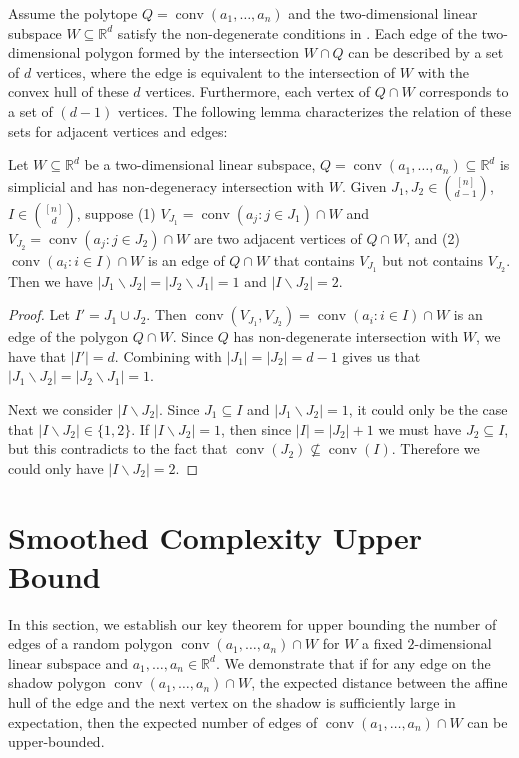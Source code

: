 \documentclass{theoretics}
\newcommand{\R}{\mathbb R}
\newcommand{\conv}{\operatorname{conv}}
\renewcommand{\subset}{\subseteq}
\begin{document}
Assume the polytope $Q = \conv(a_1,\dots,a_n)$ and the two-dimensional linear subspace $W \subset \R^d$ satisfy the non-degenerate conditions in .
Each edge of the two-dimensional polygon formed by the intersection $W \cap Q$ can be described by a set of $d$ vertices, where the edge is equivalent to the intersection of $W$ with the convex hull of these $d$ vertices. Furthermore, each vertex of $Q \cap W$ corresponds to a set of $(d-1)$ vertices. The following lemma characterizes the relation of these sets for adjacent vertices and edges:


\begin{fact}\label{fact:diff-adjacent-vertex}
    Let $W \subset \R^d$ be a two-dimensional linear subspace, $Q = \conv(a_1,\dots,a_n) \subset \R^d$ is simplicial and has non-degeneracy intersection with $W$. 
    Given $J_1, J_2 \in \binom{[n]}{d-1}$, $I \in \binom{[n]}{d}$, suppose
    (1) $V_{J_1} = \conv(a_j : j\in J_1) \cap W$ and $V_{J_2} = \conv(a_j : j\in J_2) \cap W$ are two adjacent vertices of $Q \cap W$, and (2) $\conv(a_i : i\in I) \cap W$ is an edge of $Q \cap W$ that contains $V_{J_1}$ but not contains $V_{J_2}$.
    Then we have $|J_1 \backslash J_2| = |J_2 \backslash J_1| = 1$ and $|I \backslash J_2| = 2$.
\end{fact}
\begin{proof}
    Let $I' = J_1 \cup J_2$. Then $\conv(V_{J_1}, V_{J_2}) = \conv(a_i : i\in I) \cap W$ is an edge of the polygon $Q \cap W$. Since $Q$ has non-degenerate intersection with $W$, we have that $|I'| = d$. Combining with $|J_1| = |J_2| = d-1$ gives us that $|J_1 \backslash J_2| = |J_2 \backslash J_1| = 1$.
    
    Next we consider $|I \backslash J_2|$. Since $J_1 \subset I$ and $|J_1 \backslash J_2| = 1$, it could only be the case that $|I \backslash J_2| \in \{1, 2\}$. If  $|I \backslash J_2| = 1$, then since $|I| = |J_2|+1$ we must have $J_2 \subset I$, but this contradicts to the fact that $\conv(J_2) \not\subset \conv(I)$. Therefore we could only have $|I \backslash J_2| = 2$.
\end{proof}


\section{Smoothed Complexity Upper Bound}\label{sec:ub-general}

In this section, we establish our key theorem for upper bounding the number of edges
of a random polygon $\conv(a_1,\dots,a_n) \cap W$ for $W$ a fixed $2$-dimensional
linear subspace and $a_1,\dots,a_n \in \R^d$. 
We demonstrate that if 
for any edge on the shadow polygon $\conv(a_1, \ldots, a_n) \cap W$, 
the expected distance between the affine hull of the edge and the next vertex
on the shadow is sufficiently large in expectation, then the expected number
of edges of $\conv(a_1, \ldots, a_n) \cap W$ can be upper-bounded.
\end{document}

